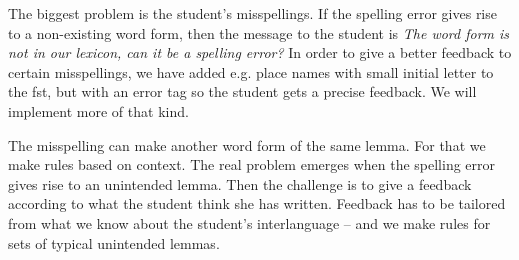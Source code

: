 \documentclass[11pt]{article}
\begin{document}
%

The biggest problem is the student's misspellings. If the spelling error gives rise to a non-existing word form, then the message to the student is \textit{The word form is not in our lexicon, can it be a spelling error?} In order to give a better feedback to certain misspellings, we have added e.g. place names with small initial letter to the fst, but with an error tag so the student gets a precise feedback. We will implement more of that kind.

The misspelling can make another word form of the same lemma. For that we make rules based on context. The real problem emerges when the spelling error gives rise to an unintended lemma. Then the challenge is to give a feedback according to what the student think she has written. Feedback has to be tailored from what we know about the student’s interlanguage – and we make rules for sets of typical unintended lemmas.
\end{document}
